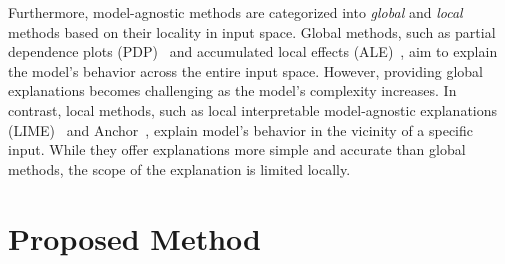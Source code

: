 \documentclass[runningheads]{llncs}
\begin{document}
Furthermore, model-agnostic methods are categorized into
\emph{global} and \emph{local} methods based on their locality in input space.
Global methods,
such as partial dependence plots (PDP)~\cite{friedman2001greedy}
and accumulated local effects (ALE)~\cite{apley2020visualizing},
aim to explain the model's behavior across the entire input space.
However, providing global explanations becomes challenging
as the model's complexity increases.
In contrast, local methods,
such as local interpretable model-agnostic explanations
(LIME)~\cite{ribeiro2016why} and Anchor~\cite{ribeiro2018anchors},
explain model's behavior in the vicinity of a specific input.
While they offer explanations more simple and accurate
than global methods,
the scope of the explanation is limited locally.

\section{Proposed Method}
\end{document}
